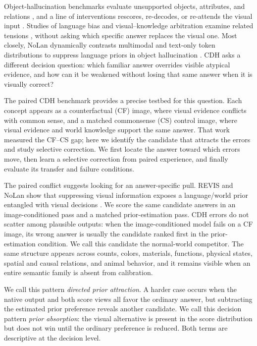 \documentclass[letterpaper]{article}
\begin{document}
Object-hallucination benchmarks evaluate unsupported objects, attributes, and
relations \cite{rohrbach2018chair,li2023pope,wang2023amber}, and a line of
interventions rescores, re-decodes, or re-attends the visual input
\cite{leng2024vcd,huang2024opera,chen2024halc,liu2024pai,wu2026revis}. Studies
of language bias and visual--knowledge arbitration examine related tensions
\cite{agrawal2018priors,zhou2025causalmm,liu2025insight,golovanevsky2025pixels},
without asking which specific answer replaces the visual one. Most closely,
NoLan dynamically contrasts multimodal and text-only token
distributions to suppress language priors in object hallucination
\cite{ren2026nolan}. CDH \cite{chen2026cdh} asks a different decision question:
which familiar answer overrides visible atypical evidence, and how can it be
weakened without losing that same answer when it is visually correct?

The paired CDH benchmark
\cite{chen2026cdh} provides a precise testbed for this question. Each concept appears as a counterfactual (CF) image, where
visual evidence conflicts with common sense, and a matched commonsense (CS)
control image, where visual evidence and world knowledge support the same
answer. That work measured the CF--CS gap; here we identify the candidate that
attracts the errors and study selective correction. We first
locate the answer toward which errors move, then learn a selective correction
from paired experience, and finally evaluate its transfer and failure
conditions.

The paired conflict suggests looking for an answer-specific pull. REVIS and
NoLan show that suppressing visual information exposes a language/world prior
entangled with visual decisions \cite{wu2026revis,ren2026nolan}. We score the same candidate answers in
an image-conditioned pass and a matched prior-estimation pass. CDH errors do not
scatter among plausible outputs: when the image-conditioned model fails on a
CF image, its wrong answer is usually the candidate ranked first in the
prior-estimation condition. We call this candidate the normal-world competitor. The
same structure appears across counts, colors, materials, functions, physical
states, spatial and causal relations, and animal behavior, and it remains
visible when an entire semantic family is absent from calibration.

We call this pattern \emph{directed prior attraction}. A
harder case occurs when the native output and both score views all favor the
ordinary answer, but subtracting the estimated prior preference reveals another
candidate. We call this decision pattern \emph{prior absorption}: the visual
alternative is present in the score distribution but does not win until the
ordinary preference is reduced. Both terms are descriptive at the decision
level.
\end{document}
